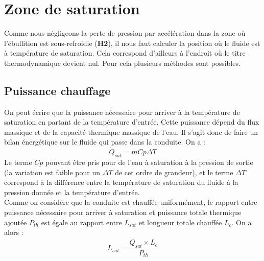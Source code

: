 \section{Zone de saturation\label{section:sat}}
Comme nous négligeons la perte de pression par accélération dans la zone où l'ébullition est sous-refroidie (\textbf{H2}), il nous faut calculer la position où le fluide est à température de saturation. Cela correspond d'ailleurs à l'endroit où le titre thermodynamique devient nul. Pour cela plusieurs méthodes sont possibles.

\subsection{Puissance chauffage}
On peut écrire que la puissance nécessaire pour arriver à la température de saturation en partant de la température d'entrée. Cette puissance dépend du flux massique et de la capacité thermique massique de l'eau. Il s'agit donc de faire un bilan énergétique sur le fluide qui passe dans la conduite. On a :
\begin{equation}
    \dot{Q}_{sat} = \dot{m} Cp \Delta T
\end{equation}
Le terme $Cp$ pouvant être pris pour de l'eau à saturation à la pression de sortie (la variation est faible pour un $\Delta T$ de cet ordre de grandeur), et le terme $\Delta T$ correspond à la différence entre la température de saturation du fluide à la pression donnée et la température d'entrée.\\ 
Comme on considère que la conduite est chauffée uniformément, le rapport entre puissance nécessaire pour arriver à saturation et puissance totale thermique ajoutée $P_{th}$ est égale au rapport entre $L_{sat}$ et longueur totale chauffée $L_c$. On a alors :
\begin{equation}
    L_{sat}= \frac{ \dot{Q}_{sat}\times L_c}{P_{th}}
\end{equation}

